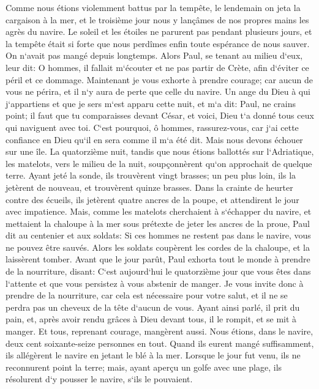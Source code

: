 \verse Comme nous étions violemment battus par la tempête, le lendemain on jeta la cargaison à la mer, 
\verse et le troisième jour nous y lançâmes de nos propres mains les agrès du navire. 
\verse Le soleil et les étoiles ne parurent pas pendant plusieurs jours, et la tempête était si forte que nous perdîmes enfin toute espérance de nous sauver. 
\verse On n`avait pas mangé depuis longtemps. Alors Paul, se tenant au milieu d`eux, leur dit: O hommes, il fallait m`écouter et ne pas partir de Crète, afin d`éviter ce péril et ce dommage. 
\verse Maintenant je vous exhorte à prendre courage; car aucun de vous ne périra, et il n`y aura de perte que celle du navire. 
\verse Un ange du Dieu à qui j`appartiens et que je sers m`est apparu cette nuit, 
\verse et m`a dit: Paul, ne crains point; il faut que tu comparaisses devant César, et voici, Dieu t`a donné tous ceux qui naviguent avec toi. 
\verse C`est pourquoi, ô hommes, rassurez-vous, car j`ai cette confiance en Dieu qu`il en sera comme il m`a été dit. 
\verse Mais nous devons échouer sur une île. 
\verse La quatorzième nuit, tandis que nous étions ballottés sur l`Adriatique, les matelots, vers le milieu de la nuit, soupçonnèrent qu`on approchait de quelque terre. 
\verse Ayant jeté la sonde, ils trouvèrent vingt brasses; un peu plus loin, ils la jetèrent de nouveau, et trouvèrent quinze brasses. 
\verse Dans la crainte de heurter contre des écueils, ils jetèrent quatre ancres de la poupe, et attendirent le jour avec impatience. 
\verse Mais, comme les matelots cherchaient à s`échapper du navire, et mettaient la chaloupe à la mer sous prétexte de jeter les ancres de la proue, 
\verse Paul dit au centenier et aux soldats: Si ces hommes ne restent pas dans le navire, vous ne pouvez être sauvés. 
\verse Alors les soldats coupèrent les cordes de la chaloupe, et la laissèrent tomber. 
\verse Avant que le jour parût, Paul exhorta tout le monde à prendre de la nourriture, disant: C`est aujourd`hui le quatorzième jour que vous êtes dans l`attente et que vous persistez à vous abstenir de manger. 
\verse Je vous invite donc à prendre de la nourriture, car cela est nécessaire pour votre salut, et il ne se perdra pas un cheveux de la tête d`aucun de vous. 
\verse Ayant ainsi parlé, il prit du pain, et, après avoir rendu grâces à Dieu devant tous, il le rompit, et se mit à manger. 
\verse Et tous, reprenant courage, mangèrent aussi. 
\verse Nous étions, dans le navire, deux cent soixante-seize personnes en tout. 
\verse Quand ils eurent mangé suffisamment, ils allégèrent le navire en jetant le blé à la mer. 
\verse Lorsque le jour fut venu, ils ne reconnurent point la terre; mais, ayant aperçu un golfe avec une plage, ils résolurent d`y pousser le navire, s`ils le pouvaient. 
